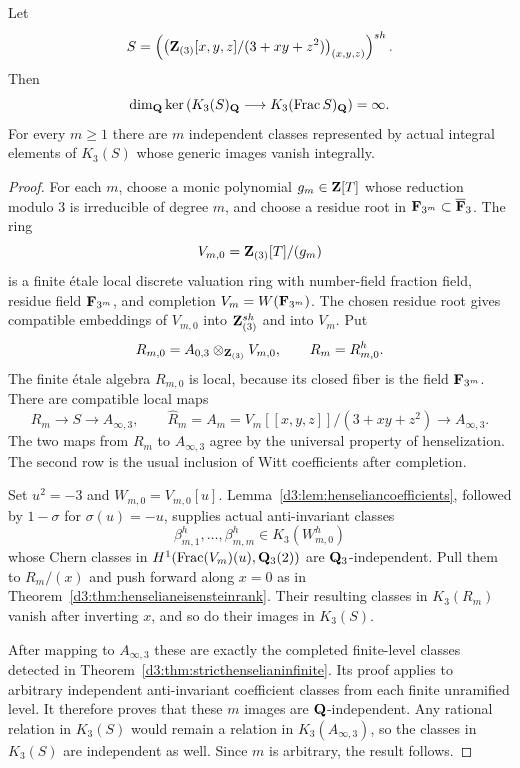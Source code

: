 \begin{corollary}
\label{d3:cor:stricthenselizationinfinite}
Let
\[
 S=\left(\left(\mathbf Z_{(3)}[x,y,z]/(3+xy+z^2)\right)_{(x,y,z)}\right)^{sh}.
\]
Then
\[
 \dim_{\mathbf Q}\ker\left(K_3(S)_{\mathbf Q}
      \longrightarrow K_3(\operatorname{Frac} S)_{\mathbf Q}\right)=\infty.
\]
For every $m\geq1$ there are $m$ independent classes represented by
actual integral elements of $K_3(S)$ whose generic images vanish
integrally.
\end{corollary}
\begin{proof}
For each $m$, choose a monic polynomial $g_m\in\mathbf Z[T]$ whose reduction
modulo $3$ is irreducible of degree $m$, and choose a residue root in
$\mathbf F_{3^m}\subset\overline{\mathbf F}_3$.
The ring
\[
 V_{m,0}=\mathbf Z_{(3)}[T]/(g_m)
\]
is a finite \'etale local discrete valuation ring with number-field
fraction field, residue field $\mathbf F_{3^m}$, and completion
$V_m=W(\mathbf F_{3^m})$.  The chosen residue root gives compatible embeddings
of $V_{m,0}$ into $\mathbf Z_{(3)}^{sh}$ and into $V_m$.
Put
\[
 R_{m,0}=A_{0,3}\otimes_{\mathbf Z_{(3)}}V_{m,0},\qquad R_m=R_{m,0}^h.
\]
The finite \'etale algebra $R_{m,0}$ is local, because its closed fiber
is the field $\mathbf F_{3^m}$.  There are compatible local maps
\[
 R_m\longrightarrow S\longrightarrow A_{\infty,3},
 \qquad
 \widehat R_m=A_m=V_m[[x,y,z]]/(3+xy+z^2)
       \longrightarrow A_{\infty,3}.
\]
The two maps from $R_m$ to $A_{\infty,3}$ agree by the universal
property of henselization.  The second row is the usual inclusion of
Witt coefficients after completion.

Set $u^2=-3$ and $W_{m,0}=V_{m,0}[u]$.
Lemma~\ref{d3:lem:henseliancoefficients}, followed by $1-\sigma$ for
$\sigma(u)=-u$, supplies actual anti-invariant classes
\[
 \beta_{m,1}^h,\ldots,\beta_{m,m}^h\in K_3(W_{m,0}^h)
\]
whose Chern classes in $H^1(\operatorname{Frac}(V_m)(u),\mathbf Q_3(2))$ are
$\mathbf Q_3$-independent.
Pull them to $R_m/(x)$ and push forward along $x=0$ as in
Theorem~\ref{d3:thm:henselianeisensteinrank}.  Their resulting classes in
$K_3(R_m)$ vanish after inverting $x$, and so do their images in
$K_3(S)$.

After mapping to $A_{\infty,3}$ these are exactly the completed
finite-level classes detected in
Theorem~\ref{d3:thm:stricthenselianinfinite}.  Its proof applies to
arbitrary independent anti-invariant coefficient classes from each
finite unramified level.  It therefore proves that these $m$ images
are $\mathbf Q$-independent.  Any rational relation in $K_3(S)$ would remain
a relation in $K_3(A_{\infty,3})$, so the classes in $K_3(S)$ are
independent as well.  Since $m$ is arbitrary, the result follows.
\end{proof}


